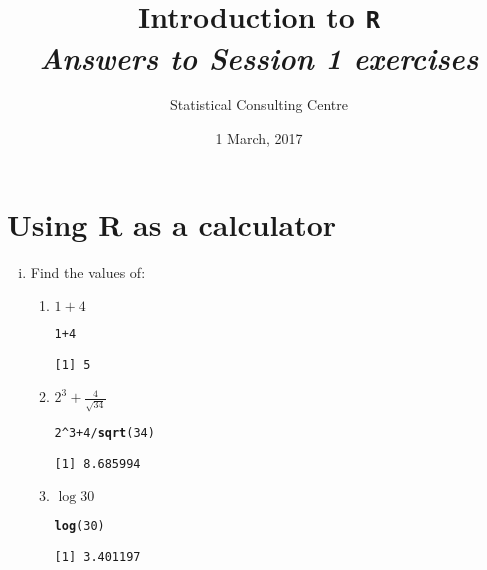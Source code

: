 \documentclass[12pt,a4paper]{article}\usepackage[]{graphicx}\usepackage[]{color}
\makeatletter
\newcommand{\hlnum}[1]{\textcolor[rgb]{0.686,0.059,0.569}{#1}}%
\newcommand{\hlopt}[1]{\textcolor[rgb]{0,0,0}{#1}}%
\newcommand{\hlstd}[1]{\textcolor[rgb]{0.345,0.345,0.345}{#1}}%
\newcommand{\hlkwd}[1]{\textcolor[rgb]{0.737,0.353,0.396}{\textbf{#1}}}%
\newenvironment{kframe}{%
 \def\at@end@of@kframe{}%
 \ifinner\ifhmode%
  \def\at@end@of@kframe{\end{minipage}}%
  \begin{minipage}{\columnwidth}%
 \fi\fi%
 \def\FrameCommand##1{\hskip\@totalleftmargin \hskip-\fboxsep
 \colorbox{shadecolor}{##1}\hskip-\fboxsep
     \hskip-\linewidth \hskip-\@totalleftmargin \hskip\columnwidth}%
 \MakeFramed {\advance\hsize-\width
   \@totalleftmargin\z@ \linewidth\hsize
   \@setminipage}}%
 {\par\unskip\endMakeFramed%
 \at@end@of@kframe}
\newenvironment{knitrout}{}{} %
\makeatother
\begin{document}
\setlength\parindent{0cm}
\title{\Large{\textbf{Introduction to \texttt{R}}}\\
\textit{Answers to Session 1 exercises}}
\author{Statistical Consulting Centre}
\date{1 March, 2017}
\maketitle

\section{Using \textbf{R} as a calculator}
\label{sec:use-r-as}

\begin{enumerate}[(i)]

\item \label{itm:calculator} Find the values of:
  \begin{enumerate}

  \item $1+4$
\begin{knitrout}
\color{fgcolor}\begin{kframe}
\begin{alltt}
\hlnum{1}\hlopt{+}\hlnum{4}
\end{alltt}
\begin{verbatim}
[1] 5
\end{verbatim}
\end{kframe}
\end{knitrout}
  \item $2^3 + \frac{4}{\sqrt{34}}$
\begin{knitrout}
\color{fgcolor}\begin{kframe}
\begin{alltt}
\hlnum{2}\hlopt{^}\hlnum{3} \hlopt{+} \hlnum{4}\hlopt{/}\hlkwd{sqrt}\hlstd{(}\hlnum{34}\hlstd{)}
\end{alltt}
\begin{verbatim}
[1] 8.685994
\end{verbatim}
\end{kframe}
\end{knitrout}
  \item $\log{30}$
\begin{knitrout}
\color{fgcolor}\begin{kframe}
\begin{alltt}
\hlkwd{log}\hlstd{(}\hlnum{30}\hlstd{)}
\end{alltt}
\begin{verbatim}
[1] 3.401197
\end{verbatim}
\end{kframe}
\end{knitrout}


\end{enumerate}
\end{enumerate}
\end{document}
